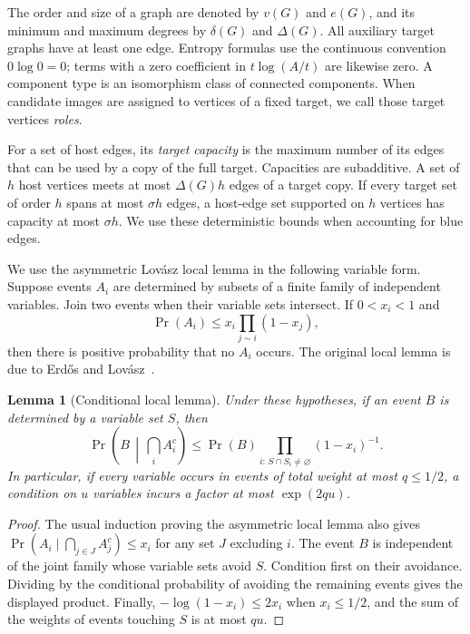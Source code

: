 \documentclass[11pt]{amsart}
\newtheorem{lemma}[theorem]{Lemma}
\theoremstyle{definition}
\theoremstyle{remark}
\numberwithin{equation}{section}
\begin{document}
The order and size of a graph are denoted by $v(G)$ and $ e(G)$, and its
minimum and maximum degrees by $\delta(G)$ and $\Delta(G)$.
All auxiliary target graphs have at least one edge.
Entropy formulas use the continuous convention $0\log 0=0$; terms
with a zero coefficient in $t\log(A/t)$ are likewise zero.
A component type is an isomorphism class of connected components.
When candidate images are assigned to vertices of a fixed target, we call
those target vertices \emph{roles}.

For a set of host edges, its \emph{target capacity} is the maximum number
of its edges that can be used by a copy of the full target. Capacities are
subadditive. A set of $h $ host vertices meets at most $\Delta(G)h$ edges
of a target copy. If every target set of order $h $ spans at most $\sigma h$
edges, a host-edge set supported on $h$ vertices has capacity at most
$\sigma h$. We use these deterministic bounds when accounting for blue edges.

We use the asymmetric Lov\'asz local lemma in the following variable form.
Suppose events $A_i$ are determined by subsets of a finite family of
independent variables. Join two events when their variable sets intersect.
If $0<x_i<1$ and
\[
 \Pr(A_i)\le x_i\prod_{j\sim i}(1-x_j),
\]
then there is positive probability that no $A_i$ occurs.
The original local lemma is due to Erd\H{o}s and Lov\'asz~\cite{EL}.

\begin{lemma}[Conditional local lemma]\label{lem:conditional-lll}
Under these hypotheses, if an event $B $ is determined by a variable set $ S$,
then
\[
 \Pr\left(B\,\middle|\,\bigcap_i A_i^c\right)
 \le \Pr(B)\prod_{i:\,S\cap S_i\ne\varnothing}(1-x_i)^{-1}.
\]
In particular, if every variable occurs in events of total weight at most
$q\le 1/2$, a condition on $ u$ variables incurs a factor at most
$\exp(2qu)$.
\end{lemma}
\begin{proof}
The usual induction proving the asymmetric local lemma also gives
$\Pr(A_i\mid\bigcap_{j\in J}A_j^c)\le x_i $ for any set $ J $ excluding $ i$.
The event $B$ is independent of the joint family whose variable sets avoid
$S$. Condition first on their avoidance. Dividing by the conditional
probability of avoiding the remaining events gives the displayed product.
Finally, $-\log(1-x_i)\le2x_i $ when $ x_i\le1/2$, and the sum of the weights
of events touching $S $ is at most $ qu$.
\end{proof}
\end{document}
